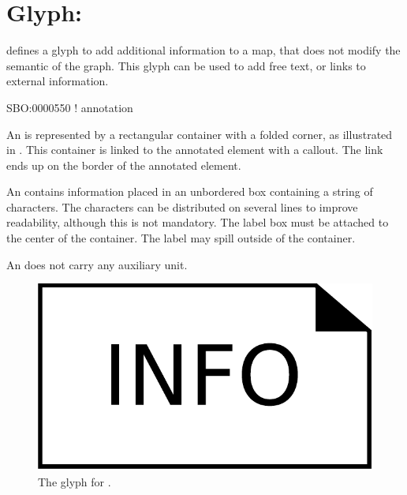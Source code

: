 
\section{Glyph: }
\label{sec:annotation}

\SBGNAFLone defines a glyph to add additional information to a map, that does not modify the semantic of the graph. This glyph can be used to add free text, or links to external information.

\begin{glyphDescription}

\glyphSboTerm SBO:0000550 ! annotation

\glyphContainer An  is represented by a rectangular container with a folded corner, as illustrated in . This container is linked to the annotated element with a callout. The link ends up on the border of the annotated element.

\glyphLabel An  contains information placed in an unbordered box containing a string of characters.  The characters can be distributed on several lines to improve readability, although this is not mandatory.  The label box must be attached to the center of the container. The label may spill outside of the container. 

\glyphAux An  does not carry any auxiliary unit.
\end{glyphDescription}

\begin{figure}[H]
  \centering
  \includegraphics[scale = 0.3]{images/annotation}
  \caption{The \AF glyph for .}
  \label{fig:annotation}
\end{figure}


